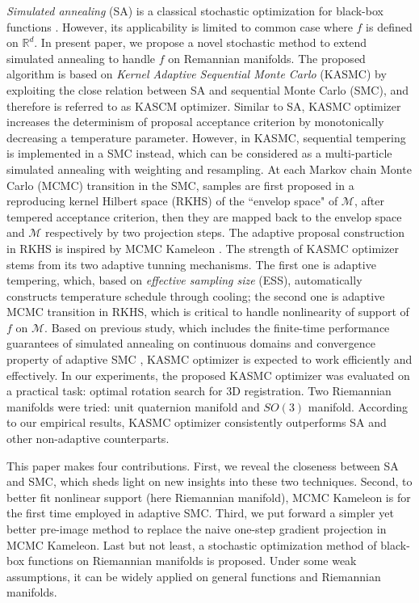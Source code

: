 \documentclass{article}
\begin{document}
\emph{Simulated annealing} (SA) is a classical stochastic optimization for black-box functions \citep{SA}. However, its applicability is limited to common case where $f$ is 
defined on $\mathbb{R}^d$. 
In present paper, we propose a novel stochastic method to extend simulated annealing to handle $f$ on Remannian manifolds. 
The proposed algorithm is based on \emph{Kernel Adaptive Sequential Monte Carlo}     
(KASMC) by exploiting the close relation between SA and sequential Monte Carlo (SMC), and therefore is referred to as KASCM optimizer.    
Similar to SA, KASMC optimizer increases the determinism of proposal acceptance criterion by monotonically decreasing a temperature parameter.     
However, in KASMC, sequential tempering is implemented in a SMC instead, which can be considered as a multi-particle simulated annealing \citep{multi_particle} 
with weighting and resampling.      
At each Markov chain Monte Carlo (MCMC) transition in the SMC, samples are first proposed in a reproducing kernel Hilbert space (RKHS) of the ``envelop space" 
of $\mathcal{M}$, after tempered acceptance criterion, then they are mapped back to the envelop space and $\mathcal{M}$ respectively by two projection steps.     
The adaptive proposal construction in RKHS is inspired by MCMC Kameleon \citep{MCMC_Kameleon}. 
The strength of KASMC optimizer stems from its two adaptive  
tunning mechanisms. The first one is adaptive tempering, which, based on \emph{effective sampling size} (ESS), automatically constructs temperature schedule 
through cooling; 
the second one is adaptive MCMC transition in RKHS, which is 
critical to handle nonlinearity of support of $f$ on $\mathcal{M}$. 
Based on previous study, which includes the finite-time performance guarantees of simulated annealing on continuous domains \citep{SA_finite_time}         
and convergence property of adaptive SMC \citep{convergence_ASMC}, KASMC optimizer is expected to work efficiently and effectively.   
In our experiments, the proposed KASMC optimizer was evaluated on a practical task: optimal rotation search for 3D registration.  
Two Riemannian manifolds were tried: unit quaternion manifold and $SO(3)$ manifold. According to our empirical results, KASMC optimizer consistently 
outperforms SA and other non-adaptive counterparts.   

This paper makes four contributions.  First, we reveal the closeness between SA and SMC, which sheds light on new insights into these two techniques.
Second, to better fit nonlinear support (here Riemannian manifold), MCMC Kameleon is for the first time employed in adaptive SMC.          
Third, we put forward a simpler yet better pre-image method to replace the naive one-step gradient projection in MCMC Kameleon.       
Last but not least, a stochastic optimization method of black-box functions on Riemannian manifolds is proposed. Under some weak assumptions, it can be widely applied 
on general functions and Riemannian manifolds. 
\end{document}
